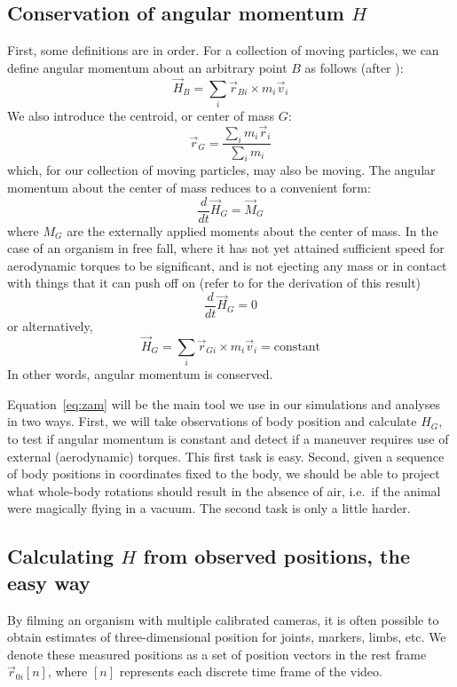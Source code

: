 \documentclass{amsart}
\begin{document}
\subsection{Conservation of angular momentum $H$}
First, some definitions are in order.  For a collection of moving particles, we can define angular momentum about an arbitrary point $B$ as follows (after \cite{Baruh:1999}):
\begin{equation}
\vec{H}_B = \sum_i \vec{r}_{Bi} \times m_i \vec{v}_i
\end{equation}
We also introduce the centroid, or center of mass $G$: 
\begin{equation}
\vec{r}_G = \frac{\sum_i m_i \vec{r}_i}{\sum_i m_i}
\label{eq:COM}
\end{equation}
which, for our collection of moving particles, may also be moving.  The angular momentum about the center of mass reduces to a convenient form:
\begin{equation}
\frac{d}{dt} \vec{H}_G = \vec{M}_G
\end{equation}
where $M_G$ are the externally applied moments about the center of mass. In the case of an organism in free fall, where it has not yet attained sufficient speed for aerodynamic torques to be significant, and is not ejecting any mass or in contact with things that it can push off on (refer to \cite{Baruh:1999} for the derivation of this result) 
\begin{equation}
\frac{d}{dt} \vec{H}_G = 0
\end{equation}
or alternatively,
\begin{equation}
\vec{H}_G = \sum_i \vec{r}_{Gi} \times m_i \vec{v}_i = \mbox{constant}
\label{eq:zam}
\end{equation}
In other words, angular momentum is conserved.  

Equation~\ref{eq:zam} will be the main tool we use in our simulations and analyses in two ways.  First, we will take observations of body position and calculate $H_G$, to test if angular momentum is constant and detect if a maneuver requires use of external (aerodynamic) torques. This first task is easy.  Second, given a sequence of body positions in coordinates fixed to the body, we should be able to project what whole-body rotations should result in the absence of air, i.e.\ if the animal were magically flying in a vacuum.  The second task is only a little harder. 






\subsection{Calculating $H$ from observed positions, the easy way}
\label{sec:forward}
By filming an organism with multiple calibrated cameras, it is often possible to obtain estimates of three-dimensional position for joints, markers, limbs, etc.  We denote these measured positions as a set of position vectors in the rest frame $\vec{r}_{0i}[n]$, where $[n]$ represents each discrete time frame of the video.  
\end{document}
